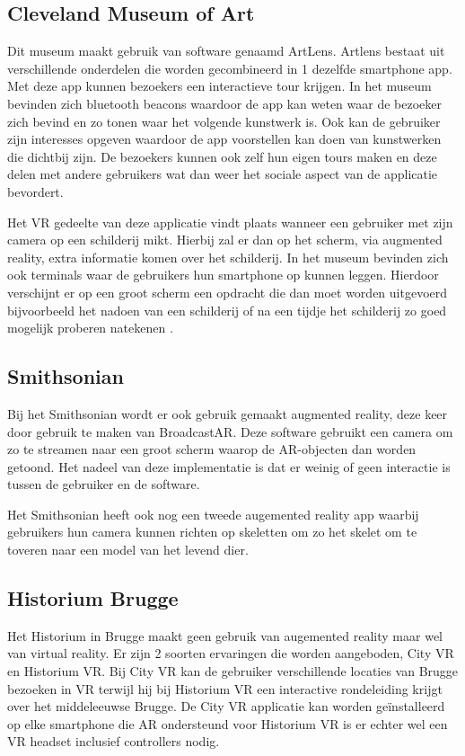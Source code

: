 \subsection{Cleveland Museum of Art}
Dit museum maakt gebruik van software genaamd ArtLens. Artlens bestaat uit verschillende onderdelen die worden gecombineerd in 1 dezelfde smartphone app. Met deze app kunnen bezoekers een interactieve tour krijgen. In het museum bevinden zich bluetooth beacons waardoor de app kan weten waar de bezoeker zich bevind en zo tonen waar het volgende kunstwerk is. Ook kan de gebruiker zijn interesses opgeven waardoor de app voorstellen kan doen van kunstwerken die dichtbij zijn. 
De bezoekers kunnen ook zelf hun eigen tours maken en deze delen met andere gebruikers wat dan weer het sociale aspect van de applicatie bevordert.

Het VR gedeelte van deze applicatie vindt plaats wanneer een gebruiker met zijn camera op een schilderij mikt. Hierbij zal er dan op het scherm, via augmented reality, extra informatie komen over het schilderij.
In het museum bevinden zich ook terminals waar de gebruikers hun smartphone op kunnen leggen. Hierdoor verschijnt er op een groot scherm een opdracht die dan moet worden uitgevoerd bijvoorbeeld het nadoen van een schilderij of na een tijdje het schilderij zo goed mogelijk proberen natekenen \autocite{Ding2017}.

\subsection{Smithsonian}
Bij het Smithsonian wordt er ook gebruik gemaakt augmented reality, deze keer door gebruik te maken van BroadcastAR. Deze software gebruikt een camera om zo te streamen naar een groot scherm waarop de AR-objecten dan worden getoond. Het nadeel van deze implementatie is dat er weinig of geen interactie is tussen de gebruiker en de software. 

Het Smithsonian heeft ook nog een tweede augemented reality app waarbij gebruikers hun camera kunnen richten op skeletten om zo het skelet om te toveren naar een model van het levend dier.

\subsection{Historium Brugge}
Het Historium in Brugge maakt geen gebruik van augemented reality maar wel van virtual reality. Er zijn 2 soorten ervaringen die worden aangeboden, City VR en Historium VR. Bij City VR kan de gebruiker verschillende locaties van Brugge bezoeken in VR terwijl hij bij Historium VR een interactive rondeleiding krijgt over het middeleeuwse Brugge. De City VR applicatie kan worden geïnstalleerd op elke smartphone die AR ondersteund voor Historium VR is er echter wel een VR headset inclusief controllers nodig. 

